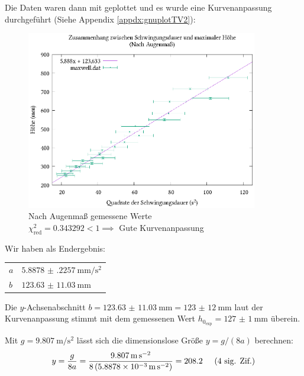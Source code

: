         \newpage
        Die Daten waren dann mit \gnuplot{} geplottet und es wurde eine Kurvenanpassung durchgeführt (Siehe Appendix \ref{appdx:gnuplotTV2}):
        \begin{figure}[H]
            \centering
            \vspace{-1em}
            \includegraphics[width=0.9\textwidth]{maxwell.eps}
            \caption{\centering Nach Augenmaß gemessene Werte\hspace{\textwidth}\\$\chi^2_{\text{red}} = 0.343292 < 1 \implies$ Gute Kurvenanpassung\vspace{-1em}}
            \label{fig:stoppuhr}
        \end{figure}
        Wir haben als Endergebnis:
        \begin{center}
            \begin{tabular}{l l}
                \toprule
                $a$ & $\SI{5.8878(2257)}{\milli\meter\per\second\squared}$ \\
                $b$ & $\SI{123.63(1103)}{\milli\meter}$ \\
                \bottomrule
            \end{tabular}
        \end{center}
        \vspace{0.5em}
        Die $y$-Achsenabschnitt $b = \SI{123.63(1103)}{\milli\meter} = \SI{123(12)}{\milli\meter}$ laut der Kurvenanpassung stimmt mit dem gemessenen Wert $h_{0_\text{exp}} = \SI{127(1)}{\milli\meter}$ überein.

        Mit $g = \SI{9.807}{\meter\per\second\squared}$ lässt sich die dimensionslose Größe $y = g/(8a)$ berechnen:
        \begin{equation}
            y = \frac{g}{8a} = \frac{\SI{9.807}{\meter\per\second\squared}}{8 \left(\SI{5,8878e-3}{\meter\per\second\squared}\right)} = \SI{208,2}{} \hspace{0.5cm}\text{(4 sig. Zif.)} \label{eqn:hny}
        \end{equation}

